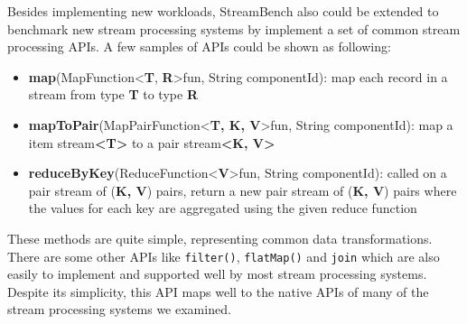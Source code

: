Besides implementing new workloads, StreamBench also could be extended to benchmark new stream processing systems by implement a set of common stream processing APIs. A few samples of APIs could be shown as following:
\begin{itemize}
\item \textbf{map}(MapFunction\textless \textbf{T}, \textbf{R}\textgreater fun, String componentId): map each record in a stream from type \textbf{T} to type \textbf{R}
\item \textbf{mapToPair}(MapPairFunction\textless \textbf{T, K, V}\textgreater fun, String componentId): map a  item stream\textbf{\textless T\textgreater } to a pair stream\textbf{\textless K, V\textgreater}
\item \textbf{reduceByKey}(ReduceFunction\textless \textbf{V}\textgreater fun, String componentId): called on a pair stream of (\textbf{K, V}) pairs, return a new pair stream of (\textbf{K, V}) pairs where the values for each key are aggregated using the given reduce function
\end{itemize}

These methods are quite simple, representing common data transformations. There are some other APIs like \texttt{filter()}, \texttt{flatMap()} and \texttt{join} which are also easily to implement and supported well by most stream processing systems. Despite its simplicity, this API maps well to the native APIs of many of the stream processing systems we examined.





